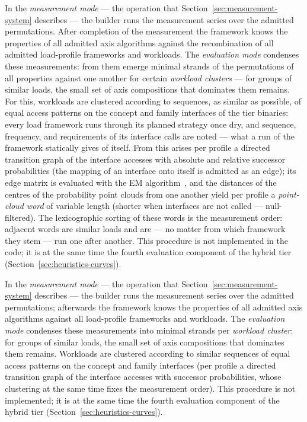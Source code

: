 \begin{nurlang}
In the \emph{measurement mode} --- the operation that Section~\ref{sec:measurement-system} describes --- the
builder runs the measurement series over the admitted permutations. After completion of the measurement the
framework knows the properties of all admitted axis algorithms against the recombination of all
admitted load-profile frameworks and workloads. The \emph{evaluation mode} condenses these
measurements: from them emerge minimal strands of the permutations of all properties against one another
for certain \emph{workload clusters} --- for groups of similar loads, the small set of
axis compositions that dominates them remains. For this, workloads are clustered according to sequences,
as similar as possible, of equal access patterns on the concept and family interfaces of the tier binaries: every
load framework runs through its planned strategy once dry, and sequence, frequency, and
requirements of its interface calls are noted --- what a run of the framework statically
gives of itself. From this arises per profile a directed transition graph of the interface accesses with
absolute and relative successor probabilities (the mapping of an interface onto itself is
admitted as an edge); its edge matrix is evaluated with the EM algorithm~\cite{dempster1977em},
and the distances of the centres of the probability point clouds from one another yield
per profile a \emph{point-cloud word} of variable length (shorter when interfaces are not called
--- null-filtered). The lexicographic sorting of these words is the measurement order:
adjacent words are similar loads and are --- no matter from which framework they
stem --- run one after another. This procedure is not implemented in the code; it is at the same time the
fourth evaluation component of the hybrid tier (Section~\ref{sec:heuristics-curves}).
\end{nurlang}
\begin{nurkurz}
In the \emph{measurement mode} --- the operation that Section~\ref{sec:measurement-system} describes ---
the builder runs the measurement series over the admitted permutations; afterwards the framework knows
the properties of all admitted axis algorithms against all load-profile frameworks and workloads. The
\emph{evaluation mode} condenses these measurements into minimal strands per \emph{workload cluster}:
for groups of similar loads, the small set of axis compositions that dominates them remains. Workloads
are clustered according to similar sequences of equal access patterns on the concept and family
interfaces (per profile a directed transition graph of the interface accesses with successor
probabilities, whose clustering at the same time fixes the measurement order). This procedure is not
implemented; it is at the same time the fourth evaluation component of the hybrid tier
(Section~\ref{sec:heuristics-curves}).
\end{nurkurz}

